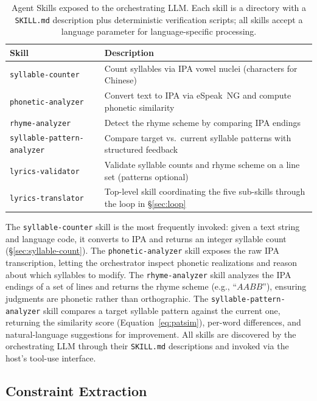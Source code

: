 \documentclass[11pt]{article}
\begin{document}
\begin{table}[t]
\centering
\small
\begin{tabular}{@{}p{3.2cm}>{\raggedright\arraybackslash}p{4.0cm}@{}}
\toprule
\textbf{Skill} & \textbf{Description} \\
\midrule
\texttt{syllable-counter} & Count syllables via IPA vowel nuclei (characters for Chinese) \\
\texttt{phonetic-analyzer} & Convert text to IPA via eSpeak~NG and compute phonetic similarity \\
\texttt{rhyme-analyzer} & Detect the rhyme scheme by comparing IPA endings \\
\texttt{syllable-pattern-\allowbreak{}analyzer} & Compare target vs.\ current syllable patterns with structured feedback \\
\texttt{lyrics-validator} & Validate syllable counts and rhyme scheme on a line set (patterns optional) \\
\texttt{lyrics-translator} & Top-level skill coordinating the five sub-skills through the loop in \S\ref{sec:loop} \\
\bottomrule
\end{tabular}
\caption{Agent Skills exposed to the orchestrating LLM\@. Each skill is a directory with a \texttt{SKILL.md} description plus deterministic verification scripts; all skills accept a language parameter for language-specific processing.}
\label{tab:tools}
\end{table}

The \texttt{syllable-counter} skill is the most frequently invoked: given a text string and language code, it converts to IPA and returns an integer syllable count (\S\ref{sec:syllable-count}).
The \texttt{phonetic-analyzer} skill exposes the raw IPA transcription, letting the orchestrator inspect phonetic realizations and reason about which syllables to modify.
The \texttt{rhyme-analyzer} skill analyzes the IPA endings of a set of lines and returns the rhyme scheme (e.g., ``$AABB$''), ensuring judgments are phonetic rather than orthographic.
The \texttt{syllable-pattern-analyzer} skill compares a target syllable pattern against the current one, returning the similarity score (Equation~\ref{eq:patsim}), per-word differences, and natural-language suggestions for improvement.
All skills are discovered by the orchestrating LLM through their \texttt{SKILL.md} descriptions and invoked via the host's tool-use interface.

\subsection{Constraint Extraction}
\label{sec:extraction}
\end{document}
